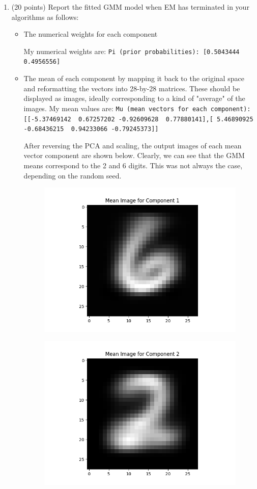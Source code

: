 \documentclass[twoside,12pt]{article}
\begin{document}
\begin{enumerate}[label*=\arabic*.]
\item (20 points) Report the fitted GMM model when EM has terminated in your algorithms as follows:
\begin{itemize}
    \item The numerical weights for each component
    
    My numerical weights are:
    \lstinline{Pi (prior probabilities): [0.5043444 0.4956556]}
    
    \item The mean of each component by mapping it back to the original space and reformatting the vectors into 28-by-28 matrices. These should be displayed as images, ideally corresponding to a kind of "average" of the images.
    My mean values are:
    \lstinline{Mu (mean vectors for each component): [[-5.37469142  0.67257202 -0.92609628  0.77880141],[ 5.46890925 -0.68436215  0.94233066 -0.79245373]]}

    After reversing the PCA and scaling, the output images of each mean vector component are shown below. Clearly, we can see that the GMM means correspond to the 2 and 6 digits. This was not always the case, depending on the random seed.
    \begin{figure}[H]
        \centering
        \includegraphics[width=\textwidth, height=.5\textwidth]{images/pc1_mean_gmm.png}
    \end{figure}
    \begin{figure}[H]
        \centering
        \includegraphics[width=\textwidth, height=.5\textwidth]{images/pc2_mean_gmm.png}
    \end{figure}


\end{itemize}
\end{enumerate}
\end{document}
